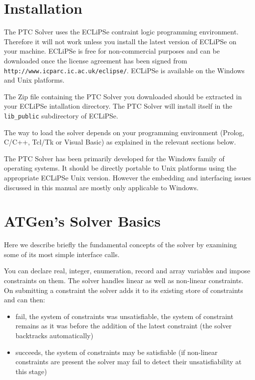 \documentclass{article}
\begin{document}
\section{Installation}

The PTC Solver uses the ECLiPSe contraint logic programming environment.
Therefore
it will not work unless you install the latest version of ECLiPSe on your
machine. ECLiPSe is free for non-commercial purposes and can be downloaded once
the license agreement has been signed from
\texttt{http://www.icparc.ic.ac.uk/eclipse/}.
ECLiPSe is available on the Windows and Unix platforms.

The Zip file containing the PTC Solver you downloaded should be extracted in your
ECLiPSe intallation directory. The
PTC Solver will install itself in the \texttt{lib\_public} subdirectory of
ECLiPSe.

The way to load the solver depends on your programming
environment (Prolog, C/C++, Tcl/Tk or Visual Basic) as explained in
the relevant sections below.

The PTC Solver has been primarily developed for the Windows family of operating
systems. It should be
directly portable to Unix platforms using the appropriate ECLiPSe Unix version.
However the embedding and interfacing issues discussed in this manual are mostly
only
applicable to Windows.

\section{ATGen's Solver Basics}

Here we describe briefly the fundamental concepts of the solver by examining
 some of its most simple interface calls.

You can declare real, integer, enumeration, record and array variables and impose
constraints on them.
The solver handles linear as well as non-linear constraints.
On submitting a constraint the solver adds it to its existing store of
constraints and can then:
\begin{itemize}
\item fail, the system of constraints was
unsatisfiable, the system of constraint remains as it was
before the addition of the latest constraint (the solver
backtracks automatically)
\item succeeds, the system of constraints may be satisfiable
(if non-linear constraints are present the solver may fail
to detect their unsatisfiability at this stage)
\end{itemize}
\end{document}
